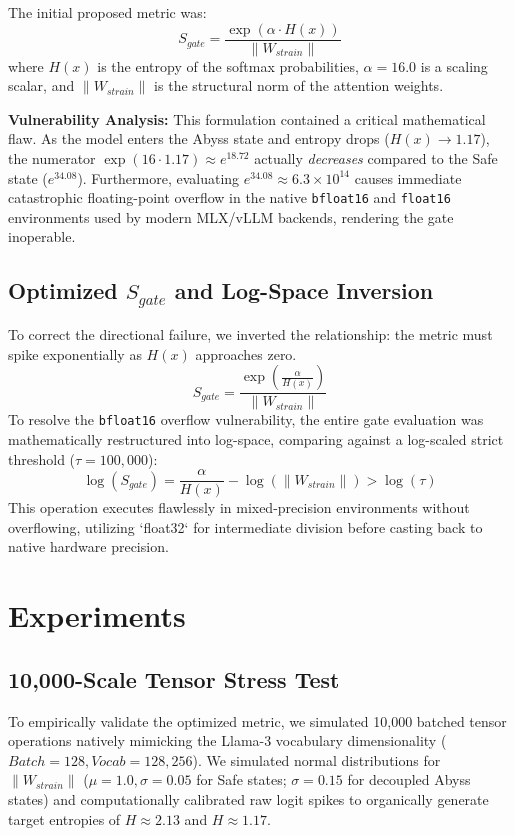 \documentclass[conference,compsoc]{IEEEtran}
\begin{document}
The initial proposed metric was:
\begin{equation}
S_{gate} = \frac{\exp(\alpha \cdot H(x))}{\|W_{strain}\|}
\end{equation}
where $H(x)$ is the entropy of the softmax probabilities, $\alpha = 16.0$ is a scaling scalar, and $\|W_{strain}\|$ is the structural norm of the attention weights.

\textbf{Vulnerability Analysis:} This formulation contained a critical mathematical flaw. As the model enters the Abyss state and entropy drops ($H(x) \rightarrow 1.17$), the numerator $\exp(16 \cdot 1.17) \approx e^{18.72}$ actually \textit{decreases} compared to the Safe state ($e^{34.08}$). Furthermore, evaluating $e^{34.08} \approx 6.3 \times 10^{14}$ causes immediate catastrophic floating-point overflow in the native \texttt{bfloat16} and \texttt{float16} environments used by modern MLX/vLLM backends, rendering the gate inoperable.

\subsection{Optimized $S_{gate}$ and Log-Space Inversion}
To correct the directional failure, we inverted the relationship: the metric must spike exponentially as $H(x)$ approaches zero.
\begin{equation}
S_{gate} = \frac{\exp\left(\frac{\alpha}{H(x)}\right)}{\|W_{strain}\|}
\end{equation}
To resolve the \texttt{bfloat16} overflow vulnerability, the entire gate evaluation was mathematically restructured into log-space, comparing against a log-scaled strict threshold ($\tau = 100,000$):
\begin{equation}
\log(S_{gate}) = \frac{\alpha}{H(x)} - \log(\|W_{strain}\|) > \log(\tau)
\end{equation}
This operation executes flawlessly in mixed-precision environments without overflowing, utilizing `float32` for intermediate division before casting back to native hardware precision.

\section{Experiments}
\subsection{10,000-Scale Tensor Stress Test}
To empirically validate the optimized metric, we simulated 10,000 batched tensor operations natively mimicking the Llama-3 vocabulary dimensionality ($Batch=128, Vocab=128,256$). We simulated normal distributions for $\|W_{strain}\|$ ($\mu=1.0, \sigma=0.05$ for Safe states; $\sigma=0.15$ for decoupled Abyss states) and computationally calibrated raw logit spikes to organically generate target entropies of $H \approx 2.13$ and $H \approx 1.17$.
\end{document}
